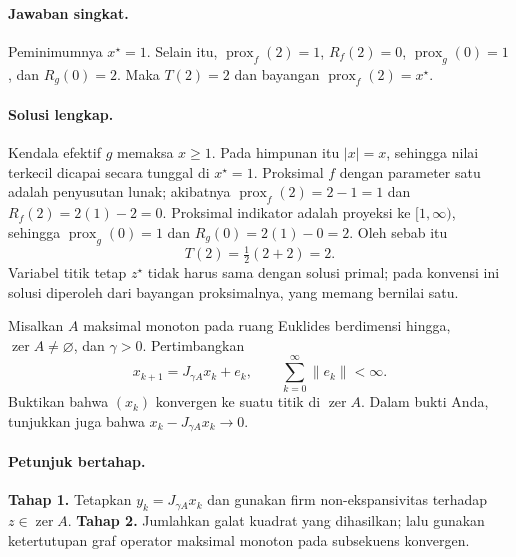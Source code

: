 \paragraph{Jawaban singkat.}
\label{orig03:ps05:answer:0004}
Peminimumnya $x^\star=1$. Selain itu,
$\operatorname{prox}_f(2)=1$, $R_f(2)=0$,
$\operatorname{prox}_g(0)=1$, dan $R_g(0)=2$. Maka $T(2)=2$ dan bayangan
$\operatorname{prox}_f(2)=x^\star$.

\paragraph{Solusi lengkap.}
\label{orig03:ps05:solution:0004}
Kendala efektif $g$ memaksa $x\ge1$. Pada himpunan itu $|x|=x$, sehingga
nilai terkecil dicapai secara tunggal di $x^\star=1$. Proksimal $f$ dengan
parameter satu adalah penyusutan lunak; akibatnya
$\operatorname{prox}_f(2)=2-1=1$ dan $R_f(2)=2(1)-2=0$. Proksimal indikator
adalah proyeksi ke $[1,\infty)$, sehingga
$\operatorname{prox}_g(0)=1$ dan $R_g(0)=2(1)-0=2$. Oleh sebab itu
\[
 T(2)=\tfrac12(2+2)=2.
\]
Variabel titik tetap $z^\star$ tidak harus sama dengan solusi primal; pada
konvensi ini solusi diperoleh dari bayangan proksimalnya, yang memang bernilai
satu.

\begin{exercise}
\label{orig03:ps05:exercise:0005}
Misalkan $A$ maksimal monoton pada ruang Euklides berdimensi hingga,
$\operatorname{zer}A\ne\varnothing$, dan $\gamma>0$. Pertimbangkan
\[
 x_{k+1}=J_{\gamma A}x_k+e_k,
 \qquad \sum_{k=0}^{\infty}\lVert e_k\rVert<\infty.
\]
Buktikan bahwa $(x_k)$ konvergen ke suatu titik di $\operatorname{zer}A$.
Dalam bukti Anda, tunjukkan juga bahwa
$x_k-J_{\gamma A}x_k\to0$.
\end{exercise}

\paragraph{Petunjuk bertahap.}
\label{orig03:ps05:hint:0005}
\textbf{Tahap 1.} Tetapkan $y_k=J_{\gamma A}x_k$ dan gunakan
firm non-ekspansivitas terhadap $z\in\operatorname{zer}A$.
\textbf{Tahap 2.} Jumlahkan galat kuadrat yang dihasilkan; lalu gunakan
ketertutupan graf operator maksimal monoton pada subsekuens konvergen.


